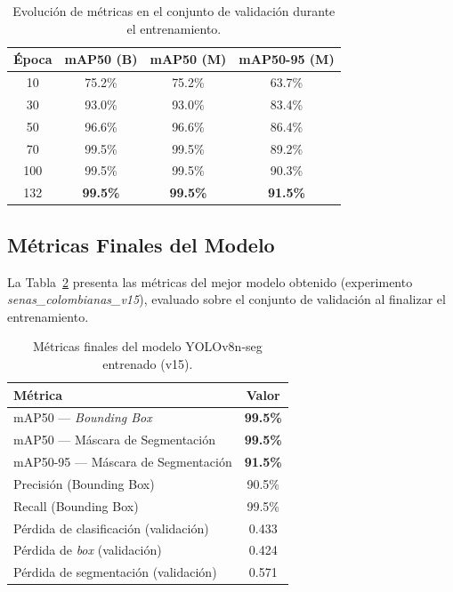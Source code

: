 \documentclass[12pt,letterpaper]{article}
\begin{document}
\begin{table}[h!]
\centering
\caption{Evolución de métricas en el conjunto de validación durante el entrenamiento.}
\label{tab:progresion}
\begin{tabular}{@{}cccc@{}}
\toprule
\textbf{Época} & \textbf{mAP50 (B)} & \textbf{mAP50 (M)} & \textbf{mAP50-95 (M)} \\ \midrule
10  & 75.2\% & 75.2\% & 63.7\% \\
30  & 93.0\% & 93.0\% & 83.4\% \\
50  & 96.6\% & 96.6\% & 86.4\% \\
70  & 99.5\% & 99.5\% & 89.2\% \\
100 & 99.5\% & 99.5\% & 90.3\% \\
132 & \textbf{99.5\%} & \textbf{99.5\%} & \textbf{91.5\%} \\ \bottomrule
\end{tabular}
\end{table}

\subsection{Métricas Finales del Modelo}
La Tabla~\ref{tab:metricas} presenta las métricas del mejor modelo obtenido (experimento \textit{senas\_colombianas\_v15}), evaluado sobre el conjunto de validación al finalizar el entrenamiento.

\begin{table}[h!]
\centering
\caption{Métricas finales del modelo YOLOv8n-seg entrenado (v15).}
\label{tab:metricas}
\begin{tabular}{@{}lc@{}}
\toprule
\textbf{Métrica} & \textbf{Valor} \\ \midrule
mAP50 — \textit{Bounding Box}             & \textbf{99.5\%} \\
mAP50 — Máscara de Segmentación           & \textbf{99.5\%} \\
mAP50-95 — Máscara de Segmentación        & \textbf{91.5\%} \\
Precisión (Bounding Box)                  & 90.5\%  \\
Recall (Bounding Box)                     & 99.5\%  \\
Pérdida de clasificación (validación)     & 0.433   \\
Pérdida de \textit{box} (validación)      & 0.424   \\
Pérdida de segmentación (validación)      & 0.571   \\ \bottomrule
\end{tabular}
\end{table}
\end{document}
